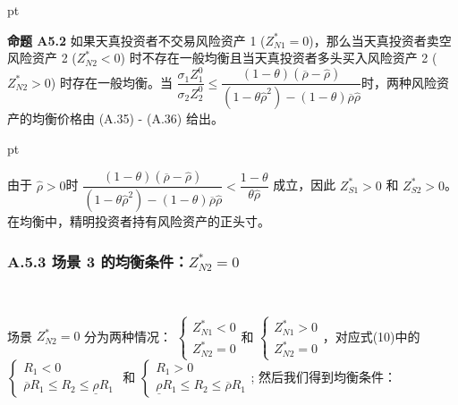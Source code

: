 \documentclass[10.0pt]{article}
\begin{document}
 pt

{\bf 命题 A5.2} 如果天真投资者不交易风险资产 1 ($ Z_{N 1}^* = 0 $)，那么当天真投资者卖空风险资产 2 ($ Z_{N 2}^* < 0 $) 时不存在一般均衡且当天真投资者多头买入风险资产 2 ($ Z_{N 2}^* > 0 $) 时存在一般均衡。当 $ \dfrac{\sigma_1 Z_1^0}{\sigma_2 Z_2^0} \leqslant \dfrac{(1 - \theta) (\overline{\rho} - {\hat \rho})}{(1 - \theta {\hat \rho}^2) - (1 - \theta) \overline{\rho} {\hat \rho}} $时，两种风险资产的均衡价格由 (A.35) - (A.36) 给出。

 pt


由于 $ \hat \rho > 0 $时 $ \dfrac{(1 - \theta) (\overline{\rho} - {\hat \rho})}{(1 - \theta {\hat \rho}^2) - (1 - \theta) \overline{\rho} {\hat \rho}} < \dfrac{1 - \theta}{\theta {\hat \rho}} $ 成立，因此 $ Z_{S 1}^ * > 0 $ 和 $ Z_{S 2}^* > 0 $。 在均衡中，精明投资者持有风险资产的正头寸。

\subsubsection*{A.5.3 \quad 场景 3 的均衡条件：$ Z_{N 2}^* = 0 $}

\quad \ 

场景 $ Z_{N 2}^* = 0 $ 分为两种情况：  $ \left\{ \begin{matrix} Z_{N 1}^* < 0 \\ Z_{N 2}^* = 0 \end{matrix} \right. $和 $ \left\{ \begin{matrix} Z_{N 1}^* > 0 \\ Z_{N 2}^* = 0 \end{matrix} \right. $，对应式(10)中的 $ \left\{ \begin{matrix} R_1 < 0 \\ \overline{\rho} R_1 \leqslant R_2 \leqslant \underline{\rho} R_1 \end{matrix} \right. $ 和 $ \left\{ \begin{matrix} R_1 > 0 \\ \underline{\rho} R_1 \leqslant R_2 \leqslant \overline{\rho} R_1 \end{matrix} \right. $; 然后我们得到均衡条件：
\end{document}

